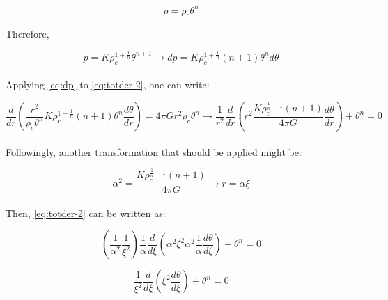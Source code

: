 \documentclass[letterpaper,12pt]{article}
\begin{document}
\begin{equation*}
    \rho = \rho_c \theta^n
\end{equation*}

Therefore, 

\begin{equation}
    \label{eq:dp}
    p = K \rho_c^{1+\frac{1}{n}} \theta^{n+1} \rightarrow dp = K \rho_c^{1+\frac{1}{n}} \left(n+1\right)\theta^n d\theta
\end{equation}

\paragraph{} Applying \eqref{eq:dp} to \eqref{eq:totder-2}, one can write:

\begin{equation}
    \frac{d}{dr}\left(\frac{r^2}{\rho_c \theta^n} K \rho_c^{1+\frac{1}{n}} \left(n+1\right)\theta^n \frac{d\theta}{dr}\right) = 4\pi G r^2 \rho_c \theta^n \rightarrow \frac{1}{r^2}\frac{d}{dr}\left(r^2 \frac{K \rho_c^{\frac{1}{n}-1} \left(n+1\right)}{4 \pi G} \frac{d\theta}{dr}\right) + \theta^n = 0
\end{equation}

\paragraph{} Followingly, another transformation that should be applied might be:

\begin{equation}
    \label{eq:alpha}
    \alpha^2 = \frac{K \rho_c^{\frac{1}{n}-1} \left(n+1\right)}{4 \pi G} \rightarrow r = \alpha \xi
\end{equation}

\paragraph{} Then, \eqref{eq:totder-2} can be written as:

\begin{equation*}
    \left(\frac{1}{\alpha^2}\frac{1}{\xi^2}\right)\frac{1}{\alpha}\frac{d}{d\xi}\left(\alpha^2\xi^2\alpha^2\frac{1}{\alpha}\frac{d\theta}{d\xi}\right) + \theta^n = 0
\end{equation*}

\begin{equation}
    \label{eq:final}
   \frac{1}{\xi^2}\frac{d}{d\xi}\left(\xi^2\frac{d\theta}{d\xi}\right) + \theta^n = 0
\end{equation}
\end{document}
